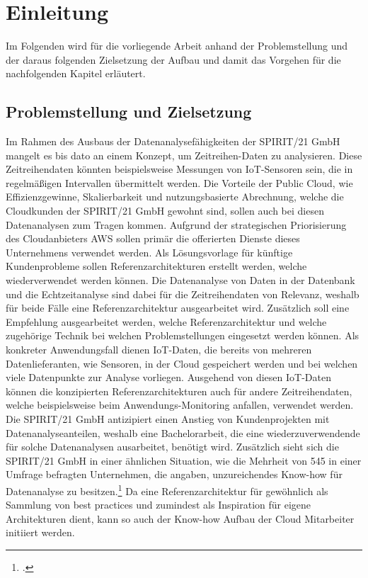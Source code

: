 \chapter{Einleitung}
Im Folgenden wird für die vorliegende Arbeit anhand der Problemstellung und der daraus folgenden Zielsetzung der Aufbau und damit das Vorgehen für die nachfolgenden Kapitel erläutert.
\section{Problemstellung und Zielsetzung}
Im Rahmen des Ausbaus der Datenanalysefähigkeiten der SPIRIT/21 GmbH mangelt es bis dato an einem Konzept, um
Zeitreihen-Daten zu analysieren. 
Diese Zeitreihendaten könnten beispielsweise Messungen von \ac{IoT}-Sensoren sein, die in regelmäßigen Intervallen übermittelt werden. Die Vorteile der Public Cloud, wie Effizienzgewinne, Skalierbarkeit und nutzungsbasierte Abrechnung, welche die Cloudkunden der SPIRIT/21 GmbH gewohnt sind, sollen auch bei diesen Datenanalysen zum Tragen kommen. 
Aufgrund der strategischen Priorisierung des Cloudanbieters \acf{AWS} sollen primär die offerierten Dienste dieses Unternehmens verwendet werden.
Als Lösungsvorlage für künftige Kundenprobleme sollen Referenzarchitekturen erstellt werden, welche wiederverwendet werden können. 
Die Datenanalyse von Daten in der Datenbank und die Echtzeitanalyse sind dabei für die
Zeitreihendaten von Relevanz, weshalb für beide Fälle eine Referenzarchitektur ausgearbeitet wird.
Zusätzlich soll eine Empfehlung ausgearbeitet werden, welche Referenzarchitektur und welche
zugehörige Technik bei welchen Problemstellungen eingesetzt werden können. Als konkreter Anwendungsfall dienen \ac{IoT}-Daten, die bereits von mehreren Datenlieferanten, wie Sensoren, in der Cloud gespeichert werden und bei welchen viele Datenpunkte zur Analyse vorliegen. Ausgehend von diesen \ac{IoT}-Daten können die konzipierten Referenzarchitekturen auch für andere Zeitreihendaten, welche beispielsweise beim Anwendungs-Monitoring anfallen, verwendet werden. 
Die SPIRIT/21 GmbH antizipiert einen Anstieg von Kundenprojekten mit Datenanalyseanteilen, weshalb eine Bachelorarbeit, die eine wiederzuverwendende für solche Datenanalysen ausarbeitet, benötigt wird. Zusätzlich sieht sich die SPIRIT/21 GmbH in einer ähnlichen Situation, wie die Mehrheit von 545 in einer Umfrage befragten Unternehmen, die angaben, unzureichendes Know-how für Datenanalyse zu besitzen.\footcite[Vgl.][]{o.V..o.J.} Da eine Referenzarchitektur für gewöhnlich als Sammlung von best practices und zumindest als Inspiration für eigene Architekturen dient, kann so auch der Know-how Aufbau der Cloud Mitarbeiter initiiert werden.

